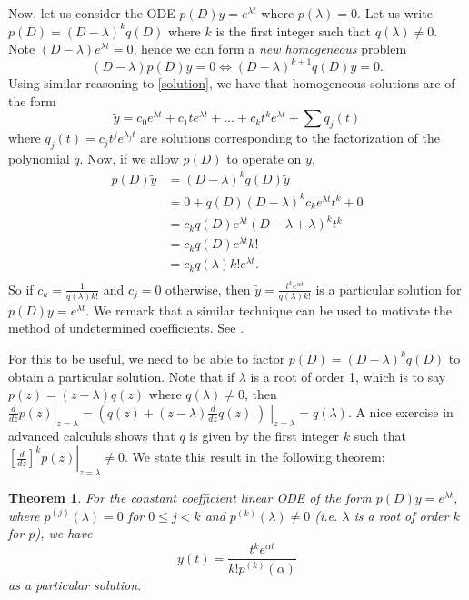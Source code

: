 \documentclass{amsart} %
\newtheorem{thm}{Theorem}
\begin{document}
Now, let us consider the ODE $p(D) y = e^{\lambda t}$ where $p(\lambda) = 0$. Let us write $p(D) = (D-\lambda)^kq(D)$ where $k$ is the first integer such that $q(\lambda) \not=0$.  Note $(D-\lambda) e^{\lambda t} = 0$, hence we can form a \emph{new homogeneous} problem
\begin{equation}
  (D-\lambda)p(D) y = 0 \iff (D-\lambda)^{k+1}q(D) y = 0.
\end{equation}
Using similar reasoning to \eqref{solution}, we have that homogeneous solutions are of the form
\begin{equation}
  \tilde y = c_0e^{\lambda t} + c_1t e^{\lambda t} + \dots + c_kt^k e^{\lambda t} + \sum q_{j}(t) \label{newhomo}
\end{equation}
where $q_j(t)=c_jt^je^{\lambda_j t}$ are solutions corresponding to the factorization of the polynomial $q$. Now, if we allow $p(D)$ to operate on $\tilde y$, 
\begin{align*}
  p(D) \tilde y 
    &= (D-\lambda)^k q(D) \tilde y \\
    &= 0 + q(D) (D-\lambda)^k c_k e^{\lambda t} t^k + 0 \\
    &= c_k q(D) e^{\lambda t} (D-\lambda + \lambda)^k t^k \\
    &= c_k q(D) e^{\lambda t} k! \\
    &= c_k q(\lambda) k!e^{\lambda t}.\\
\end{align*}
So if $c_k = \frac 1{q(\lambda)k!}$ and $c_j = 0$ otherwise, then $\tilde y = \frac{t^k e^{\alpha t}}{q(\lambda)k!}$ is a particular solution for $p(D)y = e^{\lambda t}$. We remark that a similar technique can be used to motivate the method of undetermined coefficients.  See \cite{mit}.

For this to be useful, we need to be able to factor $p(D) = (D-\lambda)^k q(D)$
to obtain a particular solution. Note that if $\lambda$ is a root of order 1,
which is to say $p(z) = (z-\lambda)q(z)$ where $q(\lambda) \not=0$, then
$\left.\frac d{dz} p(z)\right|_{z=\lambda} = \left(q(z) +
(z-\lambda)\frac{d}{dz} q(z)\middle)\right|_{z=\lambda} = q(\lambda)$. A nice
exercise in advanced calcululs shows that $q$ is given by the first integer $k$
such that $\left.\left[\frac d{dz}\right]^kp(z)\right|_{z=\lambda} \not=0$.  We state this
result in the following theorem:
\begin{thm}
  For the constant coefficient linear ODE of the form $p(D) y = e^{\lambda t}$, where $p^{(j)}(\lambda)=0$ for $0\le j <k$ and $p^{(k)}(\lambda) \not= 0$ (i.e. $\lambda$ is a root of order $k$ for $p$), we have $$y(t) = \frac{t^k e^{\alpha t}}{k!p^{(k)}(\alpha)}$$ as a particular solution.
\end{thm}
\end{document}
